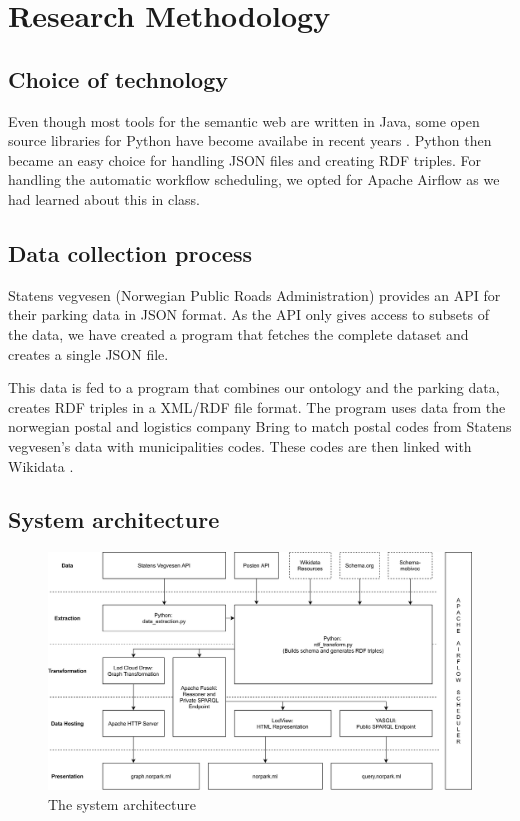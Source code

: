 \chapter{Research Methodology}

\section{Choice of technology}
Even though most tools for the semantic web are written in Java, some open source libraries for Python have become availabe in recent years \cite{w3java}. Python then became an easy choice for handling JSON files and creating RDF triples. For handling the automatic workflow scheduling, we opted for Apache Airflow as we had learned about this in class.


\section{Data collection process}
Statens vegvesen (Norwegian Public Roads Administration) \cite{statensvegvesen} provides an API for their parking data in JSON format. As the API only gives access to subsets of the data, we have created a program that fetches the complete dataset and creates a single JSON file.

This data is fed to a program that combines our ontology and the parking data, creates RDF triples in a XML/RDF file format. The program uses data from the norwegian postal and logistics company Bring \cite{bring} to match postal codes from Statens vegvesen's data with municipalities codes. These codes are then linked with Wikidata \cite{wikidata}.


\section{System architecture}

\begin{figure}[H]
	\centering
	\includegraphics[width=\linewidth]{figures/system-architecture.png}
	\caption{The system architecture}
\end{figure}




